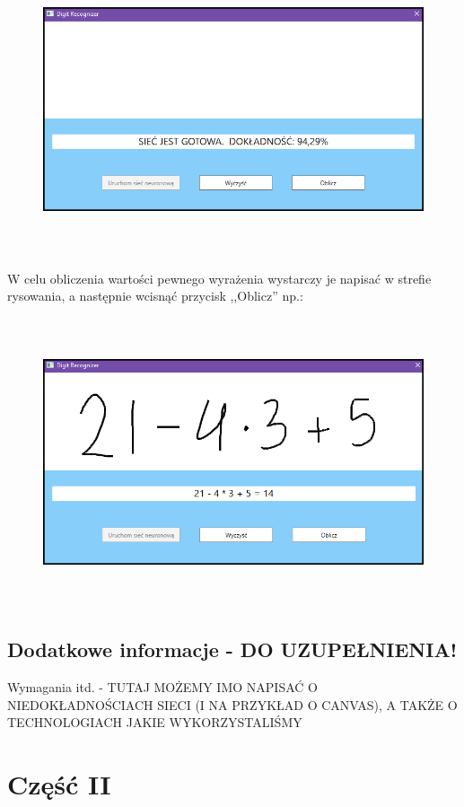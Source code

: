 \documentclass[12pt,a4paper]{article}
\begin{document}
	\begin{figure}[h!]
	\centering
	\includegraphics[height=8.5cm]{app2.png}
	\end{figure}
	
\newpage
W celu obliczenia wartości pewnego wyrażenia wystarczy je napisać w strefie rysowania, a następnie wcisnąć przycisk ,,Oblicz'' np.:

	\begin{figure}[h!]
	\centering
	\includegraphics[height=8.5cm]{app3.png}
	\end{figure}

	\subsection*{Dodatkowe informacje - \textbf{DO UZUPEŁNIENIA!}}
	Wymagania itd. - TUTAJ MOŻEMY IMO NAPISAĆ O NIEDOKŁADNOŚCIACH SIECI (I NA PRZYKŁAD O CANVAS), A TAKŻE O TECHNOLOGIACH JAKIE WYKORZYSTALIŚMY
	\newpage
	\section*{Część II}
\end{document}
